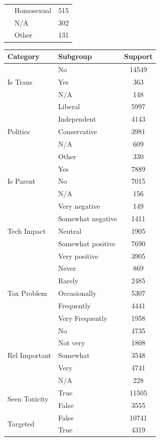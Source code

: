 \documentclass[manuscript,screen,review,anonymous]{acmart}
\theoremstyle{acmplain}
\theoremstyle{researchquestionstyle}
\begin{document}
\begin{table}[t]
\begin{minipage}[t]{0.45\linewidth}
\begin{tabular}{llc}
			& Homosexual & 515 \\
			& N/A & 302 \\
			& Other & 131 \\
			\bottomrule
		\end{tabular}
	\end{minipage}
	\begin{minipage}[t]{0.485\linewidth}
		\begin{tabular}{llc}
			\toprule
			\textbf{Category} & \textbf{Subgroup} & \textbf{Support}\\
			\midrule
			\multirow{3}{*}{Is Trans} & No & 14549 \\
			& Yes & 363 \\
			& N/A & 148 \\
			\midrule
			\multirow{5}{*}{Politics} & Liberal & 5997 \\
			& Independent & 4143 \\
			& Conservative & 3981 \\
			& N/A & 609 \\
			& Other & 330 \\
			\midrule
			\multirow{3}{*}{Is Parent} & Yes & 7889 \\
			& No & 7015 \\
			& N/A & 156 \\
			\midrule
			\multirow{5}{*}{Tech Impact} & Very negative & 149 \\
			& Somewhat negative & 1411 \\
			& Neutral & 1905 \\
			& Somewhat positive & 7690 \\
			& Very positive & 3905 \\
			\midrule
			\multirow{5}{*}{Tox Problem} & Never & 869 \\
			& Rarely & 2485 \\
			& Occasionally & 5307 \\
			& Frequently & 4441 \\
			& Very Frequently & 1958 \\
			\midrule
			\multirow{5}{*}{Rel Important} & No & 4735 \\
			& Not very & 1808 \\
			& Somewhat & 3548 \\
			& Very & 4741 \\
			& N/A & 228 \\
			\midrule
			\multirow{2}{*}{Seen Toxicity} & True & 11505 \\
			& False & 3555 \\
			\midrule
			\multirow{2}{*}{Targeted} & False & 10741 \\
			& True & 4319 \\
			\bottomrule
		\end{tabular}
	\end{minipage}
\end{table}
\end{document}
